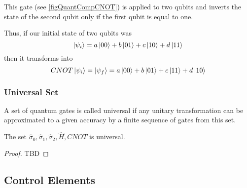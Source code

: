 This gate (see \autoref{figQuantCompCNOT}) is applied to two qubits and inverts the state of the second qubit only if the first qubit is equal to one.



Thus, if our initial state of two qubits was
\[
\ket{\psi_i} = a \ket{00} + b \ket{01} + c \ket{10} + d \ket{11}
\]
then it transforms into
\[
CNOT \ket{\psi_i} = \ket{\psi_f} = 
a \ket{00} + b \ket{01} + c \ket{11} + d \ket{10}
\]

\subsubsection{Universal Set}

\begin{definition}
A set of quantum gates is called universal if any unitary transformation can be approximated to a given accuracy by a finite sequence of gates from this set.
\end{definition}

\begin{theorem}[Kitaev]
The set $\hat{\sigma}_0, \hat{\sigma}_1,
\hat{\sigma}_2, \hat{H}, CNOT$ is universal.
\begin{proof}
TBD
\end{proof}
\end{theorem}

\subsection{Control Elements}



